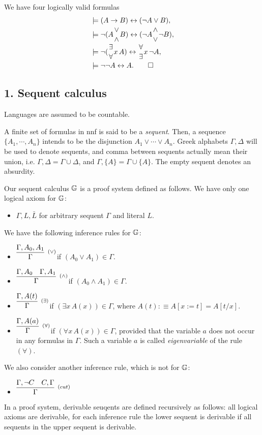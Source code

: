 \documentclass{../../../small}
\begin{document}
\begin{pf}
We have four logically valid formulas
\begin{align*}
&\models(A\to B)\leftrightarrow(\neg A\vee B),\\
&\models\neg(A{\vee\atop\wedge}B)\leftrightarrow(\neg A{\wedge\atop\vee}\neg B),\\
&\models\neg({\exists\atop\forall}x\,A)\leftrightarrow{\forall\atop\exists}x\,\neg A,\\
&\models\neg\neg A\leftrightarrow A.\qedhere
\end{align*}
\end{pf}

\subsection*{1. Sequent calculus}
\setcounter{section}{1}

Languages are assumed to be countable.
\begin{defn}
A finite set of formulas in nnf is said to be a \emph{sequent}. %
Then, a sequence $\{A_1,\cdots,A_n\}$ intends to be the disjunction $A_1\vee\cdots\vee A_n$.
Greek alphabets $\Gamma,\Delta$ will be used to denote sequents, and comma between sequents actually mean their union, i.e. $\Gamma,\Delta=\Gamma\cup\Delta$, and $\Gamma,\{A\}=\Gamma\cup\{A\}$.
The empty sequent denotes an absurdity.
\end{defn}

\begin{defn}
Our sequent calculus $\mathbb{G}$ is a proof system defined as follows.
We have only one logical axiom for $\mathbb{G}$:
\begin{itemize}
\item $\Gamma,L,\bar{L}$ for arbitrary sequent $\Gamma$ and literal $L$.
\end{itemize}
We have the following inference rules for $\mathbb{G}$:
\begin{itemize}
\item \qquad$\infer[^{(\vee)}]{\Gamma}{\Gamma,A_0,A_1}$\qquad if $(A_0\vee A_1)\in\Gamma$.
\item \qquad$\infer[^{(\wedge)}]{\Gamma}{\Gamma,A_0 & \Gamma,A_1}$\qquad if $(A_0\wedge A_1)\in\Gamma$.
\item \qquad$\infer[^{(\exists)}]{\Gamma}{\Gamma,A(t)}$\qquad if $(\exists x\,A(x))\in\Gamma$, where $A(t):\equiv A[x:=t]=A[t/x]$.
\item \qquad$\infer[^{(\forall)}]{\Gamma}{\Gamma,A(a)}$\qquad if $(\forall x\,A(x))\in\Gamma$, provided that the variable $a$ does not occur in any formulas in $\Gamma$. Such a variable $a$ is called \emph{eigenvariable} of the rule $(\forall)$.
\end{itemize}
We also consider another inference rule, which is not for $\mathbb{G}$:
\begin{itemize}
\item \qquad$\infer[^{(cut)}]{\Gamma}{\Gamma,\neg C & C,\Gamma}$\qquad
\end{itemize}
In a proof system, derivable seuqents are defined recursively as follows: all logical axioms are derivable, for each inference rule the lower sequent is derivable if all sequents in the upper sequent is derivable.
\end{defn}
\end{document}
